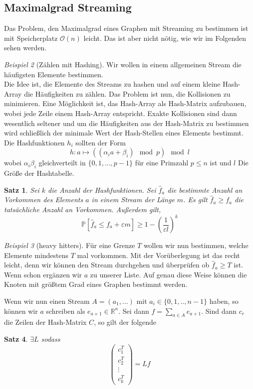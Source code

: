 \documentclass[a4paper, 12pt]{article}
\theoremstyle{plain}
\newtheorem{theorem}{Satz}[subsection] %
\theoremstyle{definition}
\theoremstyle{lemma}
\theoremstyle{remark}
\theoremstyle{corollary}
\theoremstyle{example}
\newtheorem{example}[theorem]{Beispiel}
\begin{document}
	\subsection{Maximalgrad Streaming}
	Das Problem, den Maximalgrad eines Graphen mit Streaming zu bestimmen ist mit Speicherplatz $\mathcal{O}(n)$ leicht. Das ist aber nicht nötig, wie wir im Folgenden sehen werden.\\
	\begin{example}[Zählen mit Hashing]
		Wir wollen in einem allgemeinen Stream die häufigsten Elemente bestimmen.\\
		Die Idee ist, die Elemente des Streams zu hashen und auf einem kleine Hash-Array die Häufigkeiten zu zählen. Das Problem ist nun, die Kollisionen zu minimieren. Eine Möglichkeit ist, das Hash-Array als Hash-Matrix aufzubauen, wobei jede Zeile einem Hash-Array entspricht. Exakte Kollisionen sind dann wesentlich seltener und um die Häufigkeiten aus der Hash-Matrix zu bestimmen wird schließlich der minimale Wert der Hash-Stellen eines Elements bestimmt.\\
		Die Hashfunktionen $h_i$ sollten der Form \[h: a \mapsto ((\alpha_i a + \beta_i) \mod p) \mod l\] wobei $\alpha_i\beta_i$ gleichverteilt in $\{0,1,...,p-1\}$ für eine Primzahl $p \leq n$ ist und $l$ Die Größe der Hashtabelle.\\
		\begin{theorem}
			Sei $k$ die Anzahl der Hashfunktionen. Sei $\hat f_a$ die bestimmte Anzahl an Vorkommen des Elements $a$ in einem Stream der Länge $m$. Es gilt $\hat f_a \geq f_a$ die tatsächliche Anzahl an Vorkommen. Außerdem gilt, \[\mathbb{P}[\hat f_a \leq f_a + \varepsilon m] \geq 1-\left(\frac{1}{\varepsilon l}\right)^k\]
		\end{theorem}
	\end{example}
	\begin{example}[heavy hitters]
		Für eine Grenze $T$ wollen wir nun bestimmen, welche Elemente mindestens $T$ mal vorkommen. Mit der Vorüberlegung ist das recht leicht, denn wir können den Stream durchgehen und überprüfen ob $\hat f_a \geq T$ ist. Wenn schon ergänzen wir $a$ zu unserer Liste. Auf genau diese Weise können die Knoten mit größtem Grad eines Graphen bestimmt werden.
	\end{example}
	Wenn wir nun einen Stream $A = (a_1,...)$ mit $a_i \in \{0,1,..,n-1\}$ haben, so können wir $a$ schreiben als $e_{a+1} \in \mathbb{R}^n$. Sei dann $f = \sum_{a \in A} e_{a+1}$. Sind dann $c_r$ die Zeilen der Hash-Matrix $C$, so gilt der folgende \begin{theorem}
		$\exists L$ sodass \[\begin{pmatrix}
			c_1^T\\ c_2^T\\ \vdots \\ c_k^T
		\end{pmatrix} = Lf\]
	\end{theorem}
\end{document}
